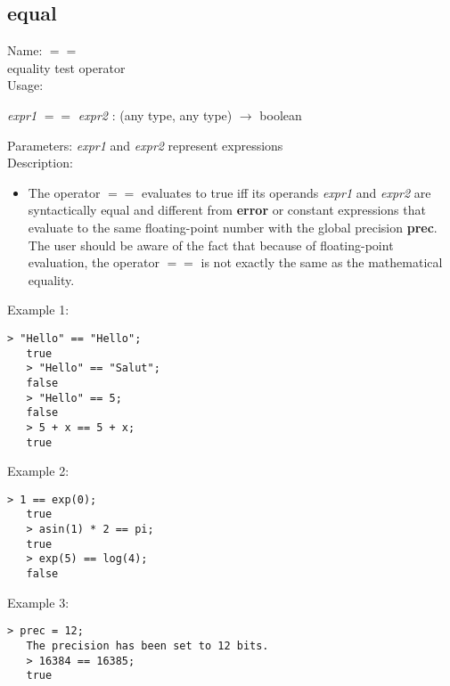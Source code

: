 \subsection{ equal }
\noindent Name: \textbf{$==$}\\
equality test operator\\

\noindent Usage: 
\begin{center}
\emph{expr1} \textbf{$==$} \emph{expr2} : (\textsf{any type}, \textsf{any type}) $\rightarrow$ \textsf{boolean}\\
\end{center}
Parameters: 
\emph{expr1} and \emph{expr2} represent expressions\\

\noindent Description: \begin{itemize}

\item The operator \textbf{$==$} evaluates to true iff its operands \emph{expr1} and
   \emph{expr2} are syntactically equal and different from \textbf{error} or constant
   expressions that evaluate to the same floating-point number with the
   global precision \textbf{prec}. The user should be aware of the fact that
   because of floating-point evaluation, the operator \textbf{$==$} is not
   exactly the same as the mathematical equality.
\end{itemize}
\noindent Example 1: 
\begin{center}\begin{minipage}{14.8cm}\begin{Verbatim}[frame=single]
   > "Hello" == "Hello";
   true
   > "Hello" == "Salut";
   false
   > "Hello" == 5;
   false
   > 5 + x == 5 + x;
   true
\end{Verbatim}
\end{minipage}\end{center}
\noindent Example 2: 
\begin{center}\begin{minipage}{14.8cm}\begin{Verbatim}[frame=single]
   > 1 == exp(0);
   true
   > asin(1) * 2 == pi;
   true
   > exp(5) == log(4);
   false
\end{Verbatim}
\end{minipage}\end{center}
\noindent Example 3: 
\begin{center}\begin{minipage}{14.8cm}\begin{Verbatim}[frame=single]
   > prec = 12;
   The precision has been set to 12 bits.
   > 16384 == 16385;
   true
\end{Verbatim}
\end{minipage}\end{center}

